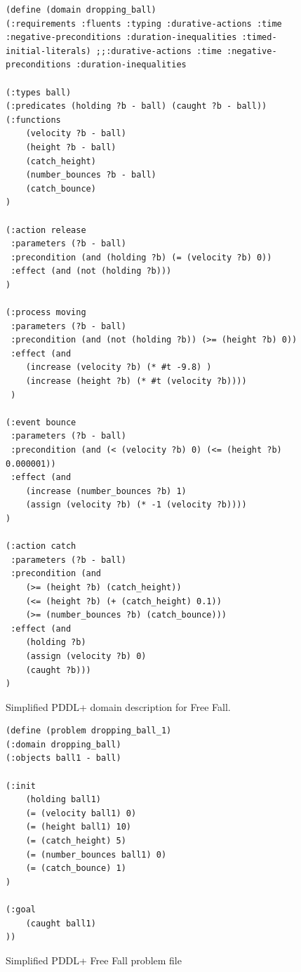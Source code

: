 \begin{figure}[thb]
\small
\begin{BVerbatim}
(define (domain dropping_ball)
(:requirements :fluents :typing :durative-actions :time :negative-preconditions :duration-inequalities :timed-initial-literals) ;;:durative-actions :time :negative-preconditions :duration-inequalities

(:types ball)
(:predicates (holding ?b - ball) (caught ?b - ball))
(:functions
    (velocity ?b - ball)
    (height ?b - ball)
    (catch_height)
    (number_bounces ?b - ball)
    (catch_bounce)
)

(:action release
 :parameters (?b - ball)
 :precondition (and (holding ?b) (= (velocity ?b) 0))
 :effect (and (not (holding ?b)))
)

(:process moving
 :parameters (?b - ball)
 :precondition (and (not (holding ?b)) (>= (height ?b) 0))
 :effect (and
    (increase (velocity ?b) (* #t -9.8) )
    (increase (height ?b) (* #t (velocity ?b))))
 )
 
(:event bounce
 :parameters (?b - ball)
 :precondition (and (< (velocity ?b) 0) (<= (height ?b) 0.000001))
 :effect (and 
    (increase (number_bounces ?b) 1)
    (assign (velocity ?b) (* -1 (velocity ?b))))
)

(:action catch
 :parameters (?b - ball)
 :precondition (and
    (>= (height ?b) (catch_height))
    (<= (height ?b) (+ (catch_height) 0.1))
    (>= (number_bounces ?b) (catch_bounce)))
 :effect (and
    (holding ?b)
    (assign (velocity ?b) 0)
    (caught ?b)))
)

\end{BVerbatim}
\caption{Simplified PDDL+ domain description for Free Fall.}
\label{fig:freefall domain}
\end{figure}

\begin{figure}[thb]
\small
\centering
\begin{BVerbatim}
(define (problem dropping_ball_1)
(:domain dropping_ball)
(:objects ball1 - ball)

(:init 
    (holding ball1)
    (= (velocity ball1) 0)
    (= (height ball1) 10)
    (= (catch_height) 5)
    (= (number_bounces ball1) 0)
    (= (catch_bounce) 1)
)

(:goal
    (caught ball1)
))
\end{BVerbatim}
\caption{Simplified PDDL+ Free Fall problem file}
\label{fig:freefall problem}
\end{figure}


